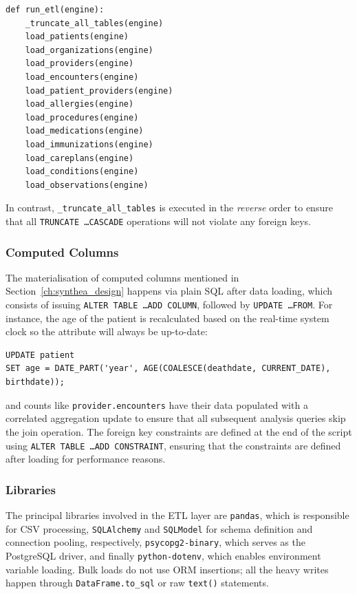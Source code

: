 \begin{lstlisting}[style=pythonstyle]
def run_etl(engine):
    _truncate_all_tables(engine)
    load_patients(engine)
    load_organizations(engine)
    load_providers(engine)
    load_encounters(engine)
    load_patient_providers(engine)
    load_allergies(engine)
    load_procedures(engine)
    load_medications(engine)
    load_immunizations(engine)
    load_careplans(engine)
    load_conditions(engine)
    load_observations(engine)
\end{lstlisting}

In contrast, \texttt{\_truncate\_all\_tables} is executed in the \emph{reverse} order to ensure that all \texttt{TRUNCATE \dots CASCADE} operations will not violate any foreign keys.

\subsubsection*{Computed Columns}

The materialisation of computed columns mentioned in Section~\ref{ch:synthea_design} happens via plain SQL after data loading, which consists of issuing \texttt{ALTER TABLE \dots ADD COLUMN}, followed by \texttt{UPDATE \dots FROM}. For instance, the age of the patient is recalculated based on the real-time system clock so the attribute will always be up-to-date:

\begin{lstlisting}[style=sqlstyle]
UPDATE patient
SET age = DATE_PART('year', AGE(COALESCE(deathdate, CURRENT_DATE), birthdate));
\end{lstlisting}

and counts like \texttt{provider.encounters} have their data populated with a correlated aggregation update to ensure that all subsequent analysis queries skip the join operation. The foreign key constraints are defined at the end of the script using \texttt{ALTER TABLE \dots ADD CONSTRAINT}, ensuring that the constraints are defined after loading for performance reasons.

\subsubsection*{Libraries}

The principal libraries involved in the ETL layer are \texttt{pandas}, which is responsible for CSV processing, \texttt{SQLAlchemy} and \texttt{SQLModel} for schema definition and connection pooling, respectively, \texttt{psycopg2-binary}, which serves as the PostgreSQL driver, and finally \texttt{python-dotenv}, which enables environment variable loading. Bulk loads do not use ORM insertions; all the heavy writes happen through \texttt{DataFrame.to\_sql} or raw \texttt{text()} statements.

